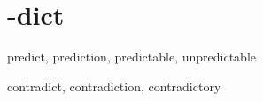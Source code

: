 \chapter{-dict}

\begin{word}{predict, prediction, predictable, unpredictable}
\end{word}

\begin{word}{contradict, contradiction, contradictory}
\end{word}

